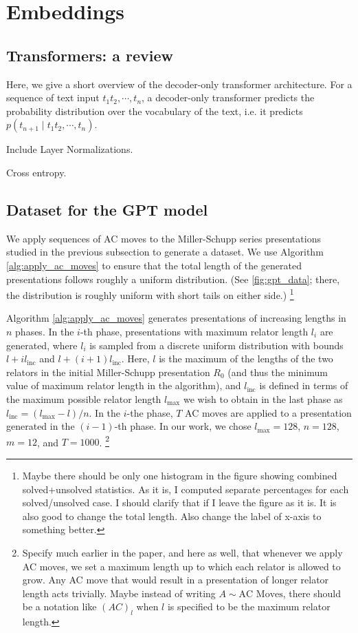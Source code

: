 
\section{Embeddings}

\subsection{Transformers: a review}

Here, we give a short overview of the decoder-only transformer architecture. For a sequence of text input $t_1 t_2, \cdots, t_n$, a decoder-only transformer predicts the probability distribution over the vocabulary of the text, i.e. it predicts $p(t_{n+1} \mid t_1 t_2, \cdots, t_n)$.



Include Layer Normalizations. 

Cross entropy.

\subsection{Dataset for the GPT model}

We apply sequences of AC moves to the Miller-Schupp series presentations studied in the previous subsection to generate a dataset.
We use Algorithm \autoref{alg:apply_ac_moves} to ensure that the total length of the generated presentations follows roughly a uniform distribution.
(See \autoref{fig:gpt_data}; there, the distribution is roughly uniform with short tails on either side.)
\footnote{Maybe there should be only one histogram in the figure showing combined solved+unsolved statistics.
As it is, I computed separate percentages for each solved/unsolved case.
I should clarify that if I leave the figure as it is.
It is also good to change the total length.
Also change the label of x-axis to something better.}

Algorithm \autoref{alg:apply_ac_moves} generates presentations of increasing lengths in $n$ phases.
In the $i$-th phase, presentations with maximum relator length $l_i$ are generated, where $l_i$ is sampled from a discrete uniform distribution with bounds $l + i l_{\text{inc}} $ and $l + (i+1) l_{\text{inc}}$.
Here, $l$ is the maximum of the lengths of the two relators in the initial Miller-Schupp presentation $R_0$ (and thus the minimum value of maximum relator length in the algorithm), and $l_{\text{inc}}$ is defined in terms of the maximum possible relator length $l_{\text{max}}$ we wish to obtain in the last phase as $l_{\text{inc}} = (l_{\text{max}}-l)/n$.
In the $i$-the phase, $T$ AC moves are applied to a presentation generated in the $(i-1)$-th phase.
In our work, we chose $l_{\text{max}}=128$, $n=128$, $m=12$, and $T=1000$.
\footnote{Specify much earlier in the paper, and here as well, that whenever we apply AC moves, we set a maximum length up to which each relator is allowed to grow.
Any AC move that would result in a presentation of longer relator length acts trivially.
Maybe instead of writing $A \sim \text{AC Moves}$, there should be a notation like $(AC)_l$ when $l$ is specified to be the maximum relator length.}

